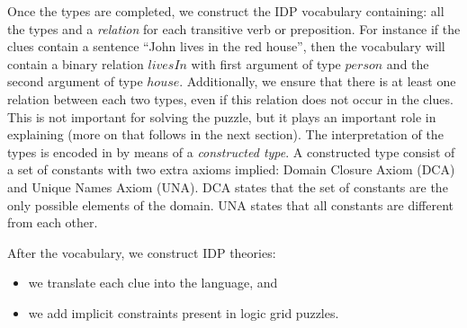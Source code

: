 Once the types are completed, we construct the IDP vocabulary containing: all the types and a \textit{relation} for each transitive verb or preposition. For instance if the clues contain a sentence ``John lives in the red house'', then the vocabulary will contain a binary relation $livesIn$ with first argument of type $person$ and the second argument of type $house$. %
Additionally, we ensure that there is at least one relation between each two types, even if this relation does not occur in the clues. This is not important for solving the puzzle, but it plays an important role in explaining (more on that follows in the next section). 
The interpretation of the types is encoded in \idp by means of a \emph{constructed type}.  A constructed type consist of a set of constants with two extra axioms implied: Domain Closure Axiom (DCA) and Unique Names Axiom (UNA). DCA states that the set of constants are the only possible elements of the domain. UNA states that all constants are different from each other.


After the vocabulary, we construct IDP theories: 
\begin{itemize}
 \item we translate each clue into the \idp language, and
 \item we add implicit constraints present in logic grid puzzles.
\end{itemize}

